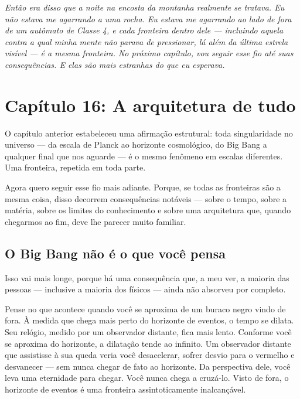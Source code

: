 \documentclass[11pt, twoside, openright]{book}
\begin{document}
\textit{Então era disso que a noite na encosta da montanha realmente se tratava. Eu não estava me agarrando a uma rocha. Eu estava me agarrando ao lado de fora de um autômato de Classe 4, e cada fronteira dentro dele --- incluindo aquela contra a qual minha mente não parava de pressionar, lá além da última estrela visível --- é a mesma fronteira. No próximo capítulo, vou seguir esse fio até suas consequências. E elas são mais estranhas do que eu esperava.}


\chapter*{Capítulo 16: A arquitetura de tudo}

O capítulo anterior estabeleceu uma afirmação estrutural: toda singularidade no universo --- da escala de Planck ao horizonte cosmológico, do Big Bang a qualquer final que nos aguarde --- é o mesmo fenômeno em escalas diferentes. Uma fronteira, repetida em toda parte.

Agora quero seguir esse fio mais adiante. Porque, se todas as fronteiras são a mesma coisa, disso decorrem consequências notáveis --- sobre o tempo, sobre a matéria, sobre os limites do conhecimento e sobre uma arquitetura que, quando chegarmos ao fim, deve lhe parecer muito familiar.


\section*{O Big Bang não é o que você pensa}

Isso vai mais longe, porque há uma consequência que, a meu ver, a maioria das pessoas --- inclusive a maioria dos físicos --- ainda não absorveu por completo.

Pense no que acontece quando você se aproxima de um buraco negro vindo de fora. À medida que chega mais perto do horizonte de eventos, o tempo se dilata. Seu relógio, medido por um observador distante, fica mais lento. Conforme você se aproxima do horizonte, a dilatação tende ao infinito. Um observador distante que assistisse à sua queda veria você desacelerar, sofrer desvio para o vermelho e desvanecer --- sem nunca chegar de fato ao horizonte. Da perspectiva dele, você leva uma eternidade para chegar. Você nunca chega a cruzá-lo. Visto de fora, o horizonte de eventos é uma fronteira assintoticamente inalcançável.
\end{document}
